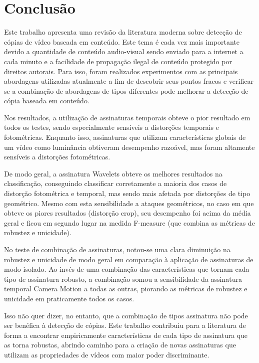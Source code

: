 
\chapter{Conclusão}
\label{chap:conclusao}

Este trabalho apresenta uma revisão da literatura moderna sobre detecção de cópias de vídeo baseada em conteúdo. Este tema é cada vez mais importante devido a quantidade de conteúdo audio-visual sendo enviado para a internet a cada minuto e a facilidade de propagação ilegal de conteúdo protegido por direitos autorais. Para isso, foram realizados experimentos com as principais abordagens utilizadas atualmente a fim de descobrir seus pontos fracos e verificar se a combinação de abordagens de tipos diferentes pode melhorar a detecção de cópia baseada em conteúdo.

Nos resultados, a utilização de assinaturas temporais obteve o pior resultado em todos os testes, sendo especialmente sensíveis a distorções temporais e fotométricas. Enquanto isso, assinaturas que utilizam características globais de um vídeo como luminância obtiveram desempenho razoável, mas foram altamente sensíveis a distorções fotométricas.

De modo geral, a assinatura Wavelets obteve os melhores resultados na classificação, conseguindo classificar corretamente a maioria dos casos de distorção fotométrica e temporal, mas sendo mais afetada por distorções de tipo geométrico. Mesmo com esta sensibilidade a ataques geométricos, no caso em que obteve os piores resultados (distorção crop), seu desempenho foi acima da média geral e ficou em segundo lugar na medida F-measure (que combina as métricas de robustez e unicidade).

No teste de combinação de assinaturas, notou-se uma clara diminuição na robustez e unicidade de modo geral em comparação à aplicação de assinaturas de modo isolado. Ao invés de uma combinação das características que tornam cada tipo de assinatura robusto, a combinação somou a sensibilidade da assinatura temporal Camera Motion a todas as outras, piorando as métricas de robustez e unicidade em praticamente todos os casos.

Isso não quer dizer, no entanto, que a combinação de tipos assinatura não pode ser benéfica à detecção de cópias. Este trabalho contribuiu para a literatura de forma a encontrar empiricamente características de cada tipo de assinatura que as torna robustas, abrindo caminho para a criação de novas assinaturas que utilizam as propriedades de vídeos com maior poder discriminante.


